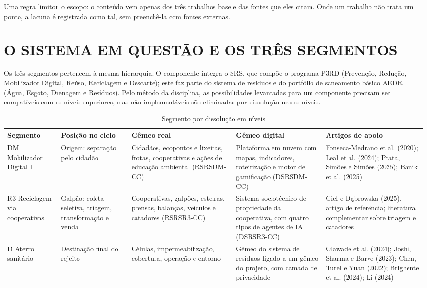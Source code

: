 \documentclass[12pt,a4paper,article,oneside,english,brazil]{abntex2}
\newcommand{\fontetab}[1]{\par\vspace{3pt}{\small\noindent Fonte: #1\par}}
\begin{document}
Uma regra limitou o escopo: o conteúdo vem apenas dos três trabalhos base e das fontes que eles citam. Onde um trabalho não trata um ponto, a lacuna é registrada como tal, sem preenchê-la com fontes externas.

\section{O SISTEMA EM QUESTÃO E OS TRÊS SEGMENTOS}

Os três segmentos pertencem à mesma hierarquia. O componente integra o SRS, que compõe o programa P3RD (Prevenção, Redução, Mobilizador Digital, Reúso, Reciclagem e Descarte); este faz parte do sistema de resíduos e do portfólio de saneamento básico AEDR (Água, Esgoto, Drenagem e Resíduos). Pelo método da disciplina, as possibilidades levantadas para um componente precisam ser compatíveis com os níveis superiores, e as não implementáveis são eliminadas por dissolução nesses níveis.

\begin{table}[!htbp]
\centering
\caption{Segmento por dissolução em níveis}
\label{tab:segmentos}
\footnotesize
\begin{tabularx}{\linewidth}{>{\raggedright\arraybackslash}p{2.3cm} >{\raggedright\arraybackslash}p{2.2cm} Y Y Y}
\hline
\textbf{Segmento} & \textbf{Posição no ciclo} & \textbf{Gêmeo real} & \textbf{Gêmeo digital} & \textbf{Artigos de apoio}\\
\hline
DM \textperiodcentered{} Mobilizador Digital 1 & Origem: separação pelo cidadão & Cidadãos, ecopontos e lixeiras, frotas, cooperativas e ações de educação ambiental (RSRSDM-CC) & Plataforma em nuvem com mapas, indicadores, roteirização e motor de gamificação (DSRSDM-CC) & Fonseca-Medrano et al. (2020); Leal et al. (2024); Prata, Simões e Simões (2025); Banik et al. (2025)\\
R3 \textperiodcentered{} Reciclagem via cooperativas & Galpão: coleta seletiva, triagem, transformação e venda & Cooperativas, galpões, esteiras, prensas, balanças, veículos e catadores (RSRSR3-CC) & Sistema sociotécnico de propriedade da cooperativa, com quatro tipos de agentes de IA (DSRSR3-CC) & Giel e Dąbrowska (2025), artigo de referência; literatura complementar sobre triagem e catadores\\
D \textperiodcentered{} Aterro sanitário & Destinação final do rejeito & Células, impermeabilização, cobertura, operação e entorno & Gêmeo do sistema de resíduos ligado a um gêmeo do projeto, com camada de privacidade & Olawade et al. (2024); Joshi, Sharma e Barve (2023); Chen, Turel e Yuan (2022); Brighente et al. (2024); Li (2024)\\
\hline
\end{tabularx}
\fontetab{Elaborado pelo autor (2026).}
\end{table}
\end{document}
